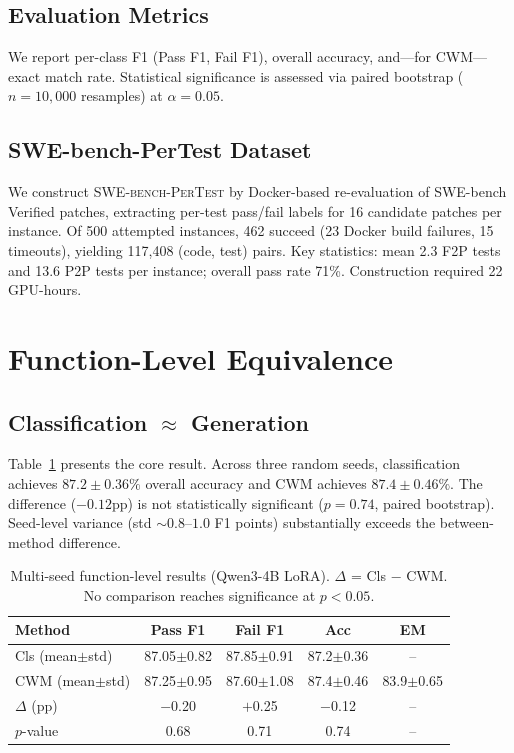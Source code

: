 \documentclass[11pt,a4paper]{article}
\begin{document}
\subsection{Evaluation Metrics}

We report per-class F1 (Pass F1, Fail F1), overall accuracy, and---for CWM---exact match rate.
Statistical significance is assessed via paired bootstrap ($n{=}10{,}000$ resamples) at $\alpha{=}0.05$.

\subsection{SWE-bench-PerTest Dataset}
\label{sec:dataset}

We construct \textsc{SWE-bench-PerTest} by Docker-based re-evaluation of SWE-bench Verified patches, extracting per-test pass/fail labels for 16 candidate patches per instance.
Of 500 attempted instances, 462 succeed (23 Docker build failures, 15 timeouts), yielding 117{,}408 (code, test) pairs.
Key statistics: mean 2.3 F2P tests and 13.6 P2P tests per instance; overall pass rate 71\%.
Construction required 22 GPU-hours.

\section{Function-Level Equivalence}
\label{sec:func}

\subsection{Classification $\approx$ Generation}

Table~\ref{tab:multiseed} presents the core result.
Across three random seeds, classification achieves $87.2\pm0.36\%$ overall accuracy and CWM achieves $87.4\pm0.46\%$.
The difference ($-0.12$pp) is not statistically significant ($p{=}0.74$, paired bootstrap).
Seed-level variance (std ${\sim}0.8$--$1.0$ F1 points) substantially exceeds the between-method difference.

\begin{table}[t]
\centering
\small
\caption{Multi-seed function-level results (Qwen3-4B LoRA). $\Delta$ = Cls $-$ CWM. No comparison reaches significance at $p < 0.05$.}
\label{tab:multiseed}
\begin{tabular}{lcccc}
\toprule
\textbf{Method} & \textbf{Pass F1} & \textbf{Fail F1} & \textbf{Acc} & \textbf{EM} \\
\midrule
Cls (mean$\pm$std) & 87.05$\pm$0.82 & 87.85$\pm$0.91 & 87.2$\pm$0.36 & -- \\
CWM (mean$\pm$std) & 87.25$\pm$0.95 & 87.60$\pm$1.08 & 87.4$\pm$0.46 & 83.9$\pm$0.65 \\
\midrule
$\Delta$ (pp) & $-$0.20 & $+$0.25 & $-$0.12 & -- \\
$p$-value & 0.68 & 0.71 & 0.74 & -- \\
\bottomrule
\end{tabular}
\end{table}
\end{document}
